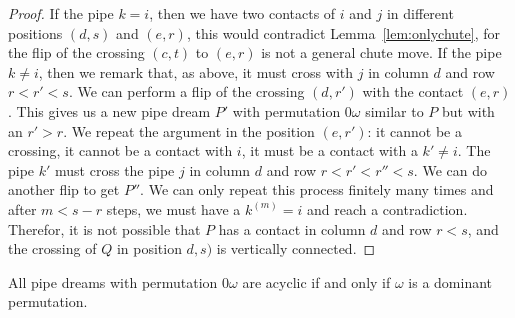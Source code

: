 \begin{proof}
If the pipe $k=i$, then we have two contacts of $i$ and $j$ in different positions $(d,s)$ and $(e,r)$, this would contradict Lemma~\ref{lem:onlychute}, for the flip of the crossing $(c,t)$
to $(e,r)$ is not a general chute move. If the pipe $k\ne i$, then we remark that, as above, it must cross with $j$ in column $d$ and row $r<r'<s$. We can perform a flip of the crossing
$(d,r')$ with the contact $(e,r)$. This gives us a new pipe dream $P'$ with permutation $0\omega$ similar to $P$ but with an $r'>r$. We repeat the argument in the position $(e,r')$: it cannot be a crossing,
it cannot be a contact with $i$, it must be a contact with a $k'\ne i$. The pipe $k'$ must cross the pipe $j$ in column $d$ and row $r<r'<r''<s$. We can do another flip to get $P''$.
We can only repeat this process finitely many times and after $m<s-r$ steps, we must have a $k^{(m)}=i$ and reach a contradiction. 
Therefor, it is not possible that $P$ has a contact in column $d$ and row $r<s$, and the crossing of $Q$ in position $d,s)$ is vertically connected.
\end{proof}

\begin{theorem}%
\label{prob:nuAcyclicProperty}
All pipe dreams with permutation $0 \omega$ are acyclic if and only if $\omega$ is a dominant permutation.
\end{theorem}

